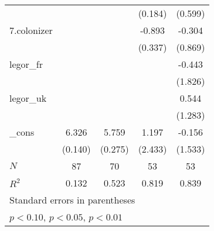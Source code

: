 {\begin{tabular}{l*{4}{c}}
            &                     &                     &     (0.184)         &     (0.599)         \\
[1em]
7.colonizer &                     &                     &      -0.893\sym{*}  &      -0.304         \\
            &                     &                     &     (0.337)         &     (0.869)         \\
[1em]
legor\_fr    &                     &                     &                     &      -0.443         \\
            &                     &                     &                     &     (1.826)         \\
[1em]
legor\_uk    &                     &                     &                     &       0.544         \\
            &                     &                     &                     &     (1.283)         \\
[1em]
\_cons      &       6.326\sym{***}&       5.759\sym{***}&       1.197         &      -0.156         \\
            &     (0.140)         &     (0.275)         &     (2.433)         &     (1.533)         \\
\hline
\(N\)       &          87         &          70         &          53         &          53         \\
\(R^{2}\)   &       0.132         &       0.523         &       0.819         &       0.839         \\
\hline\hline
\multicolumn{5}{l}{\footnotesize Standard errors in parentheses}\\
\multicolumn{5}{l}{\footnotesize \sym{*} \(p<0.10\), \sym{**} \(p<0.05\), \sym{***} \(p<0.01\)}\\
\end{tabular}
}
